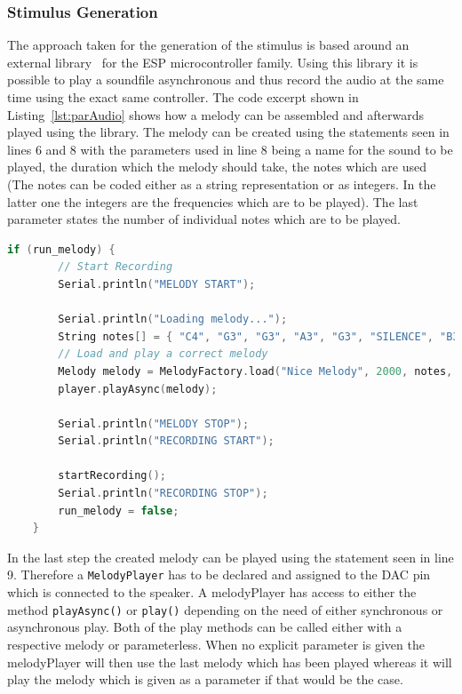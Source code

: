\subsubsection{Stimulus Generation}
The approach taken for the generation of the stimulus is based around an external library~\cite{melodyPlayer} for the ESP microcontroller family.
Using this library it is possible to play a soundfile asynchronous and thus record the audio at the same time using the exact same controller.
The code excerpt shown in Listing~\ref{lst:parAudio} shows how a melody can be assembled and afterwards played using the library.
The melody can be created using the statements seen in lines 6 and 8 with the parameters used in line 8 being a name for the sound to be played, the duration which the melody should take, the notes which are used (The notes can be coded either as a string representation or as integers.
In the latter one the integers are the frequencies which are to be played).
The last parameter states the number of individual notes which are to be played.  
\begin{lstlisting}[frame=single, language={c++}, style=style,
	caption={The function which is used to scale the captured recordings volume.}, label={lst:parAudio},float=!htb]
	if (run_melody) {
		// Start Recording
		Serial.println("MELODY START");
		
		Serial.println("Loading melody...");
		String notes[] = { "C4", "G3", "G3", "A3", "G3", "SILENCE", "B3", "C4"};
		// Load and play a correct melody
		Melody melody = MelodyFactory.load("Nice Melody", 2000, notes, 8);
		player.playAsync(melody);
		
		Serial.println("MELODY STOP");
		Serial.println("RECORDING START");
		
		startRecording();
		Serial.println("RECORDING STOP");
		run_melody = false;
	}
\end{lstlisting}

In the last step the created melody can be played using the statement seen in line 9.
Therefore a \texttt{MelodyPlayer} has to be declared and assigned to the DAC pin which is connected to the speaker.
A melodyPlayer has access to either the method \texttt{playAsync()} or \texttt{play()} depending on the need of either synchronous or asynchronous play.
Both of the play methods can be called either with a respective melody or parameterless.
When no explicit parameter is given the melodyPlayer will then use the last melody which has been played whereas it will play the melody which is given as a parameter if that would be the case.

